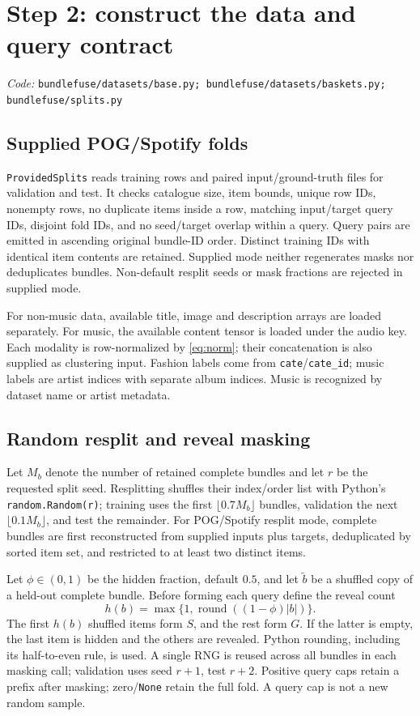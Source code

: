 \documentclass[11pt,a4paper]{article}
\newcommand{\code}[1]{\nolinkurl{#1}}
\newcommand{\src}[1]{\par\begingroup\raggedright\textit{Code: }\code{#1}\par\endgroup}
\numberwithin{equation}{section}
\begin{document}
\section{Step 2: construct the data and query contract}\label{sec:data}
\src{bundlefuse/datasets/base.py; bundlefuse/datasets/baskets.py; bundlefuse/splits.py}

\subsection{Supplied POG/Spotify folds}
\code{ProvidedSplits} reads training rows and paired input/ground-truth files for validation
and test. It checks catalogue size, item bounds, unique row IDs, nonempty rows, no duplicate
items inside a row, matching input/target query IDs, disjoint fold IDs, and no seed/target
overlap within a query. Query pairs are emitted in ascending original bundle-ID order.
Distinct training IDs with identical item contents are retained. Supplied mode neither
regenerates masks nor deduplicates bundles. Non-default resplit seeds or mask fractions
are rejected in supplied mode.

For non-music data, available title, image and description arrays are loaded separately.
For music, the available content tensor is loaded under the audio key. Each modality is
row-normalized by \eqref{eq:norm}; their concatenation is also supplied as clustering
input. Fashion labels come from \code{cate}/\code{cate_id}; music labels are artist
indices with separate album indices. Music is recognized by dataset name or artist metadata.

\subsection{Random resplit and reveal masking}
Let $M_b$ denote the number of retained complete bundles and let $r$ be the requested split
seed. Resplitting shuffles their index/order list with Python's \code{random.Random(r)};
training uses the first $\lfloor0.7M_b\rfloor$ bundles, validation the next
$\lfloor0.1M_b\rfloor$, and test the remainder. For POG/Spotify resplit mode, complete
bundles are first reconstructed from supplied inputs plus targets, deduplicated by sorted
item set, and restricted to at least two distinct items.

Let $\phi\in(0,1)$ be the hidden fraction, default $0.5$, and let $\widetilde b$ be a shuffled
copy of a held-out complete bundle. Before forming each query define the reveal count
\begin{equation}
 h(b)=\max\{1,\operatorname{round}((1-\phi)|b|)\}.
\end{equation}
The first $h(b)$ shuffled items form $S$, and the rest form $G$. If the latter is empty,
the last item is hidden and the others are revealed. Python rounding, including its
half-to-even rule, is used. A single RNG is reused across all bundles in each masking call;
validation uses seed $r+1$, test $r+2$. Positive query caps retain a prefix after masking;
zero/\code{None} retain the full fold. A query cap is not a new random sample.
\end{document}

